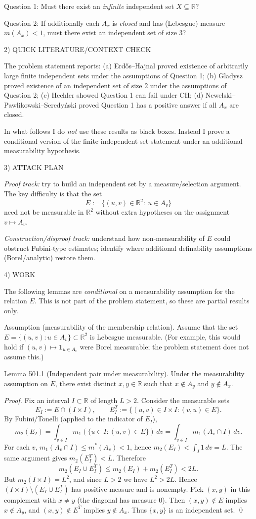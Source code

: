 Question 1: Must there exist an \emph{infinite} independent set $X\subseteq\mathbb R$?

Question 2: If additionally each $A_x$ is \emph{closed} and has (Lebesgue) measure $m(A_x)<1$, must there exist an independent set of size $3$?

2) QUICK LITERATURE/CONTEXT CHECK

The problem statement reports: (a) Erd\H{o}s--Hajnal proved existence of arbitrarily large finite independent sets under the assumptions of Question 1; (b) Gladysz proved existence of an independent set of size $2$ under the assumptions of Question 2; (c) Hechler showed Question 1 can fail under CH; (d) Newelski--Pawlikowski--Seredy\'nski proved Question 1 has a positive answer if all $A_x$ are closed.

In what follows I do \emph{not} use these results as black boxes. Instead I prove a conditional version of the finite independent-set statement under an additional measurability hypothesis.

3) ATTACK PLAN

\emph{Proof track:} try to build an independent set by a measure/selection argument. The key difficulty is that the set
\[E:=\{(u,v)\in\mathbb R^2:\ u\in A_v\}
\]
need not be measurable in $\mathbb R^2$ without extra hypotheses on the assignment $v\mapsto A_v$.

\emph{Construction/disproof track:} understand how non-measurability of $E$ could obstruct Fubini-type estimates; identify where additional definability assumptions (Borel/analytic) restore them.

4) WORK

The following lemmas are \emph{conditional} on a measurability assumption for the relation $E$.
This is not part of the problem statement, so these are partial results only.

Assumption (measurability of the membership relation).
Assume that the set $E=\{(u,v): u\in A_v\}\subset\mathbb R^2$ is Lebesgue measurable.
(For example, this would hold if $(u,v)\mapsto \mathbf 1_{u\in A_v}$ were Borel measurable; the problem statement does not assume this.)

Lemma 501.1 (Independent pair under measurability).
Under the measurability assumption on $E$, there exist distinct $x,y\in\mathbb R$ such that $x\notin A_y$ and $y\notin A_x$.

\emph{Proof.}
Fix an interval $I\subset\mathbb R$ of length $L>2$.
Consider the measurable sets
\[E_I:=E\cap (I\times I),\qquad E_I^T:=\{(u,v)\in I\times I : (v,u)\in E\}.
\]
By Fubini/Tonelli (applied to the indicator of $E_I$),
\[
 m_2(E_I)=\int_{v\in I} m_1(\{u\in I: (u,v)\in E\})\,dv
=\int_{v\in I} m_1(A_v\cap I)\,dv.
\]
For each $v$, $m_1(A_v\cap I)\le m^*(A_v)<1$, hence $m_2(E_I)<\int_I 1\,dv = L$.
The same argument gives $m_2(E_I^T)<L$.
Therefore
\[
 m_2(E_I\cup E_I^T)\le m_2(E_I)+m_2(E_I^T) < 2L.
\]
But $m_2(I\times I)=L^2$, and since $L>2$ we have $L^2>2L$.
Hence $(I\times I)\setminus (E_I\cup E_I^T)$ has positive measure and is nonempty.
Pick $(x,y)$ in this complement with $x\ne y$ (the diagonal has measure $0$).
Then $(x,y)\notin E$ implies $x\notin A_y$, and $(x,y)\notin E^T$ implies $y\notin A_x$.
Thus $\{x,y\}$ is an independent set. \qed

